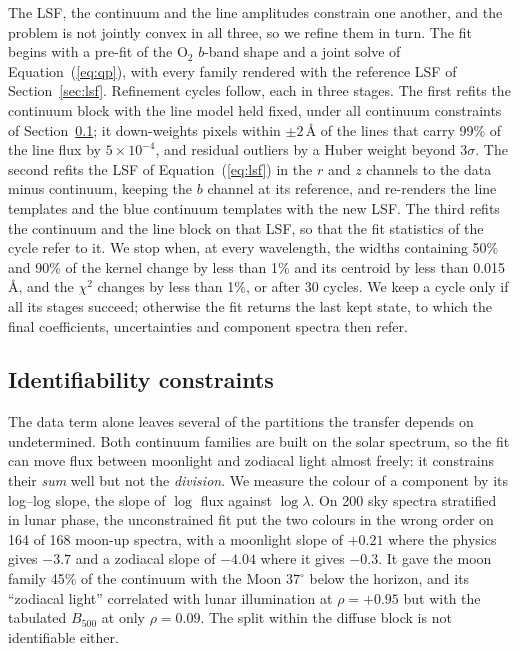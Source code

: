 The LSF, the continuum and the line amplitudes constrain one another, and the
problem is not jointly convex in all three, so we refine them in turn. The
fit begins with a pre-fit of the O$_2$ $b$-band shape and a joint solve of
Equation~(\ref{eq:qp}), with every family rendered with the reference LSF of
Section~\ref{sec:lsf}. Refinement cycles follow, each in three stages. The
first refits the continuum block with the line model held fixed, under all
continuum constraints of Section~\ref{sec:constraints}; it down-weights
pixels within $\pm2$\,\AA{} of the lines that carry 99\% of the line flux by
$5\times10^{-4}$, and residual outliers by a Huber weight beyond $3\sigma$.
The second refits the LSF of Equation~(\ref{eq:lsf}) in the $r$ and $z$
channels to the data minus continuum, keeping the $b$ channel at its
reference, and re-renders the line templates and the blue continuum
templates with the new LSF. The third refits the continuum and the line
block on that LSF, so that the fit statistics of the cycle refer to it. We
stop when, at every wavelength, the widths containing 50\% and 90\% of the
kernel change by less than 1\% and its centroid by less than 0.015\,\AA, and
the $\chi^2$ changes by less than 1\%, or after 30 cycles. We keep a cycle
only if all its stages succeed; otherwise the fit returns the last kept
state, to which the final coefficients, uncertainties and component spectra
then refer.

\subsection{Identifiability constraints}
\label{sec:constraints}

The data term alone leaves several of the partitions the transfer depends on
undetermined. Both continuum families are built on the solar spectrum, so the
fit can move flux between moonlight and zodiacal light almost freely: it
constrains their \emph{sum} well but not the \emph{division}. We measure the
colour of a component by its log--log slope, the slope of $\log$ flux against
$\log\lambda$. On 200 sky spectra stratified in lunar phase, the
unconstrained fit put the two colours in the wrong order on 164 of 168
moon-up spectra, with a moonlight slope of $+0.21$ where the physics gives
$-3.7$ and a zodiacal slope of $-4.04$ where it gives $-0.3$. It gave the
moon family 45\% of the continuum with the Moon $37^\circ$ below the
horizon, and its ``zodiacal light'' correlated with lunar illumination at
$\rho = +0.95$ but with the tabulated $B_{500}$ at only $\rho = 0.09$. The
split within the diffuse block is not identifiable either.

